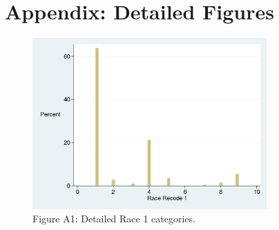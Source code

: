                       

\section*{Appendix: Detailed Figures}

\begin{figure}[H]
    \centering
    \includegraphics[width=0.8\textwidth]{figA1.png}
    \caption{Figure A1: Detailed Race 1 categories.}
    \label{fig:figA1}
\end{figure}
